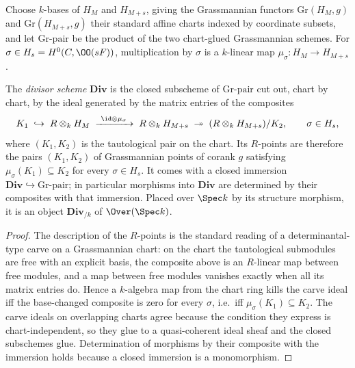 \begin{definition}
  \label{def:divScheme}
  \leanok
  Choose \(k\)-bases of \(H_M\) and \(H_{M+s}\), giving the Grassmannian functors
  \(\mathrm{Gr}(H_M, g)\) and \(\mathrm{Gr}(H_{M+s}, g)\) their standard affine charts
  indexed by coordinate subsets, and let \(\mathrm{Gr}\text{-pair}\) be the product of the
  two chart-glued Grassmannian schemes. For \(\sigma \in H_s = H^0(C, \OO(sF))\), multiplication
  by \(\sigma\) is a \(k\)-linear map \(\mu_\sigma \colon H_M \to H_{M+s}\).

  The \emph{divisor scheme} \(\mathbf{Div}\) is the closed subscheme of
  \(\mathrm{Gr}\text{-pair}\) cut out, chart by chart, by the ideal generated by the matrix
  entries of the composites
  \[
    K_1 \;\hookrightarrow\; R \otimes_k H_M \;\xrightarrow{\ \id \otimes \mu_\sigma\ }\;
      R \otimes_k H_{M+s} \;\twoheadrightarrow\; (R \otimes_k H_{M+s})/K_2 ,
    \qquad \sigma \in H_s ,
  \]
  where \((K_1, K_2)\) is the tautological pair on the chart. Its \(R\)-points are therefore
  the pairs \((K_1, K_2)\) of Grassmannian points of corank \(g\) satisfying
  \(\mu_\sigma(K_1) \subseteq K_2\) for every \(\sigma \in H_s\). It comes with a closed
  immersion \(\mathbf{Div} \hookrightarrow \mathrm{Gr}\text{-pair}\); in particular
  morphisms into \(\mathbf{Div}\) are determined by their composites with that immersion.
  Placed over \(\Spec k\) by its structure morphism, it is an object
  \(\mathbf{Div}_{/k}\) of \(\Over(\Spec k)\).
\end{definition}
\begin{proof}
  \leanok
  The description of the \(R\)-points is the standard reading of a determinantal-type carve
  on a Grassmannian chart: on the chart the tautological submodules are free with an
  explicit basis, the composite above is an \(R\)-linear map between free modules, and a map
  between free modules vanishes exactly when all its matrix entries do. Hence a \(k\)-algebra
  map from the chart ring kills the carve ideal iff the base-changed composite is zero for
  every \(\sigma\), i.e.\ iff \(\mu_\sigma(K_1) \subseteq K_2\). The carve ideals on
  overlapping charts agree because the condition they express is chart-independent, so they
  glue to a quasi-coherent ideal sheaf and the closed subschemes glue. Determination of
  morphisms by their composite with the immersion holds because a closed immersion is a
  monomorphism.
\end{proof}

